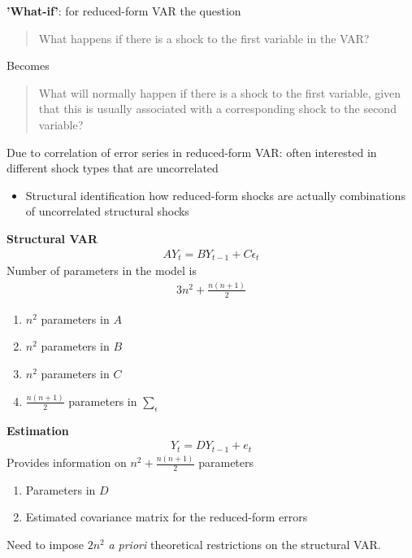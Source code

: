 \documentclass{beamer}
\begin{document}
\begin{frame}
  \textbf{'What-if'}: for reduced-form VAR the question  
  \begin{quote}
    What happens if there is a shock to the first variable in the VAR?  
  \end{quote}
  \medskip
  Becomes   
  \begin{quote}
    What will normally happen if there is a shock to the first variable, given that this is usually associated with a corresponding shock to the second variable?    
  \end{quote}
  \medskip
  Due to correlation of error series in reduced-form VAR: often interested in different shock types that are uncorrelated
  \begin{itemize}
    \item Structural identification how reduced-form shocks are actually combinations of uncorrelated structural shocks
  \end{itemize}
\end{frame}

\begin{frame}
  \textbf{Structural VAR}
  \begin{align}  
  AY_t = BY_{t-1} + C\epsilon_t 
  \end{align}
  \medskip
  Number of parameters in the model is
  \begin{align}
    3n^2 + \frac{n(n+1)}{2}
  \end{align}
  \begin{enumerate}
    \item $n^2$ parameters in $A$
    \item $n^2$ parameters in $B$
    \item $n^2$ parameters in $C$
    \medskip
    \item $\frac{n(n+1)}{2}$ parameters in $\sum_{\epsilon}$
  \end{enumerate}
\end{frame}

\begin{frame}
  \textbf{Estimation}\\  
  \begin{align}  
  Y_t = DY_{t-1} + e_t 
  \end{align}
  \medskip
  Provides information on $n^2+\frac{n(n+1)}{2}$ parameters
  \begin{enumerate}
    \item Parameters in $D$
    \item Estimated covariance matrix for the reduced-form errors
  \end{enumerate}
  \medskip
  Need to impose $2n^2$ \textit{a priori} theoretical restrictions on the structural VAR.  
\end{frame}
\end{document}
